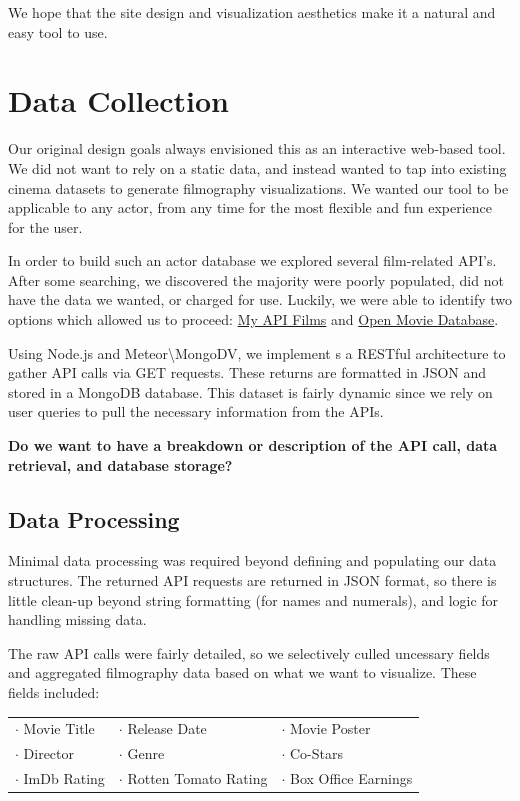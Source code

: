 \documentclass[12pt]{article}
\begin{document}
We hope that the site design and visualization aesthetics make it a natural and easy tool to use.
\newpage 

\section{Data Collection}

Our original design goals always envisioned this as an interactive web-based tool.  We did not want to rely on a static data, and instead wanted to tap into existing cinema datasets to generate filmography visualizations.  We wanted our tool to be applicable to any actor, from any time for the most flexible and fun experience for the user. 

	In order to build such an actor database we explored several film-related API's.  After some searching, we discovered the majority were poorly populated, did not have the data we wanted, or charged for use.  Luckily, we were able to identify two options which allowed us to proceed: \href{http://api.myapifilms.com/index.do}{My API Films} and \href{http://www.omdbapi.com/}{Open Movie Database}. 
	
	Using Node.js and Meteor\textbackslash MongoDV, we implement s a RESTful architecture to gather API calls via GET requests. These returns are formatted in JSON and stored in a MongoDB database. This dataset is fairly dynamic since we rely on user queries to pull the necessary information from the APIs.

	
	\begin{center}
	\color{blue}
	\textbf{Do we want to have a breakdown or description of the API call, data retrieval, and database storage? }
	\end{center}
	
\subsection{Data Processing}
	Minimal data processing was required beyond defining and populating our data structures.  The returned API requests are returned in JSON format, so there is little clean-up beyond string formatting (for names and numerals), and logic for handling missing data.  
	
	The raw API calls were fairly detailed, so we selectively culled uncessary fields and aggregated filmography data based on what we want to visualize. These fields included:
	
	\begin{center}
	\begin{tabular}{lll}
	$\cdot$ Movie Title & $\cdot$ Release Date & $\cdot$ Movie Poster\\
	$\cdot$ Director  & $\cdot$ Genre & $\cdot$ Co-Stars\\
	$\cdot$ ImDb Rating & $\cdot$ Rotten Tomato Rating & $\cdot$ Box Office Earnings\\
	\end{tabular}
	\end{center}
	
\end{document}
